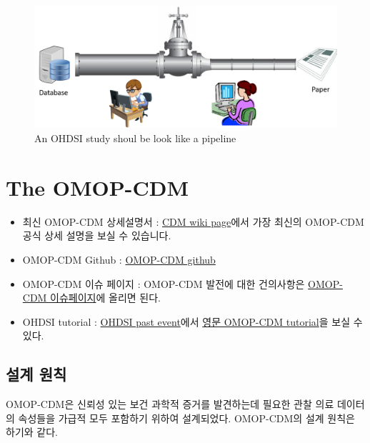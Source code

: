 \documentclass[]{book}
\providecommand{\tightlist}{%
  \setlength{\itemsep}{0pt}\setlength{\parskip}{0pt}}
\begin{document}
\begin{figure}
\includegraphics[width=0.8\linewidth]{images/OhdsiCommunity/study_pipeline} \caption{An OHDSI study shoul be look like a pipeline}\label{fig:ohdsiStudyShouldBeLookLikeAPipeline}
\end{figure}

\hypertarget{omopCdm}{%
\chapter{The OMOP-CDM}\label{omopCdm}}

\begin{itemize}
\tightlist
\item
  최신 OMOP-CDM 상세설명서 : \href{https://github.com/ohdsi/commondatamodel/wiki}{CDM wiki page}에서 가장 최신의 OMOP-CDM 공식 상세 설명을 보실 수 있습니다.
\item
  OMOP-CDM Github : \href{https://github.com/ohdsi/commondatamodel}{OMOP-CDM github}
\item
  OMOP-CDM 이슈 페이지 : OMOP-CDM 발전에 대한 건의사항은 \href{https://github.com/ohdsi/commondatamodel/issues}{OMOP-CDM 이슈페이지}에 올리면 된다.
\item
  OHDSI tutorial : \href{https://www.ohdsi.org/past-events/}{OHDSI past event}에서 \href{https://www.ohdsi.org/past-events/2018-tutorials-omop-common-data-model-and-standardized-vocabularies/}{영문 OMOP-CDM tutorial}을 보실 수 있다.
\end{itemize}

\hypertarget{section-1}{%
\section{설계 원칙}\label{section-1}}

OMOP-CDM은 신뢰성 있는 보건 과학적 증거를 발견하는데 필요한 관찰 의료 데이터의 속성들을 가급적 모두 포함하기 위하여 설계되었다. OMOP-CDM의 설계 원칙은 하기와 같다.
\end{document}
